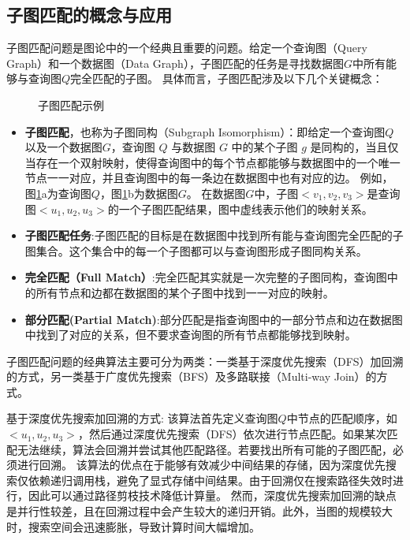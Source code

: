 \subsection{子图匹配的概念与应用}
子图匹配问题是图论中的一个经典且重要的问题。给定一个查询图（Query Graph）和一个数据图（Data Graph），子图匹配的任务是寻找数据图$G$中所有能够与查询图$Q$完全匹配的子图。
具体而言，子图匹配涉及以下几个关键概念：
\begin{figure}[h!]
    \centering
    \caption{子图匹配示例}
    \label{fig:example_subgraph_matching}
\end{figure}
\begin{itemize}
    \item \textbf{子图匹配}，也称为子图同构（Subgraph Isomorphism）：即给定一个查询图$Q$以及一个数据图$G$，查询图 $Q$ 与数据图 $G$ 中的某个子图 $g$ 是同构的，当且仅当存在一个双射映射，使得查询图中的每个节点都能够与数据图中的一个唯一节点一一对应，并且查询图中的每一条边在数据图中也有对应的边。
    例如，图\ref{fig:example_subgraph_matching}a为查询图$Q$，图\ref{fig:example_subgraph_matching}b为数据图$G$。
    在数据图$G$中，子图$<v_1,v_2,v_3>$是查询图$<u_1,u_2,u_3>$的一个子图匹配结果，图中虚线表示他们的映射关系。
    \item \textbf{子图匹配任务}:子图匹配的目标是在数据图中找到所有能与查询图完全匹配的子图集合。这个集合中的每一个子图都可以与查询图形成子图同构关系。
    \item \textbf{完全匹配（Full Match）}:完全匹配其实就是一次完整的子图同构，查询图中的所有节点和边都在数据图的某个子图中找到一一对应的映射。
    \item \textbf{部分匹配(Partial Match)}:部分匹配是指查询图中的一部分节点和边在数据图中找到了对应的关系，但不要求查询图的所有节点都能够找到映射。
\end{itemize}


子图匹配问题的经典算法主要可分为两类：一类基于深度优先搜索（DFS）加回溯的方式\cite{sm-ullmann-DBLP:journals/jacm/Ullmann76}，另一类基于广度优先搜索（BFS）及多路联接（Multi-way Join）的方式\cite{sm-bfs-DBLP:conf/focs/AtseriasGM08}。

基于深度优先搜索加回溯的方式: 该算法首先定义查询图$Q$中节点的匹配顺序，如$<u_1, u_2, u_3>$，然后通过深度优先搜索（DFS）依次进行节点匹配。如果某次匹配无法继续，算法会回溯并尝试其他匹配路径。若要找出所有可能的子图匹配，必须进行回溯。
该算法的优点在于能够有效减少中间结果的存储，因为深度优先搜索仅依赖递归调用栈，避免了显式存储中间结果。由于回溯仅在搜索路径失效时进行，因此可以通过路径剪枝技术降低计算量。
然而，深度优先搜索加回溯的缺点是并行性较差，且在回溯过程中会产生较大的递归开销。此外，当图的规模较大时，搜索空间会迅速膨胀，导致计算时间大幅增加。

